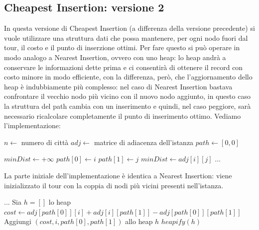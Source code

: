 \documentclass[a4paper,12pt]{report}
\begin{document}
\subsection{Cheapest Insertion: versione 2}
In questa versione di Cheapest Insertion (a differenza della versione precedente) si vuole utilizzare una struttura dati che possa mantenere, per ogni nodo fuori dal tour, il costo e il punto di inserzione ottimi. Per fare questo si può operare in modo analogo a Nearest Insertion, ovvero con uno heap: lo heap andrà a conservare le informazioni dette prima e ci consentirà di ottenere il record con costo minore in modo efficiente, con la differenza, però, che l'aggiornamento dello heap è indubbiamente più complesso: nel caso di Nearest Insertion bastava confrontare il vecchio nodo più vicino con il nuovo nodo aggiunto, in questo caso la struttura del path cambia con un inserimento e quindi, nel caso peggiore, sarà necessario ricalcolare completamente il punto di inserimento ottimo. Vediamo l'implementazione:
\begin{tcolorbox}[colframe=black, colback=white, boxrule=0.5pt, title=Cheapest Insertion Versione 2, coltitle=black, fonttitle=\bfseries, colbacktitle=white, breakable]
  \begin{algorithmic}[1]
    \State $n \gets$ numero di città
    \State $adj \gets$ matrice di adiacenza dell'istanza
    \State $path \gets [0, 0]$
    
    \State $minDist \gets +\infty$
          \State $path[0] \gets i$
          \State $path[1] \gets j$
          \State $minDist \gets adj[i][j]$
        \EndIf
      \EndFor
    \EndFor
    \State ...
  \end{algorithmic}
\end{tcolorbox}
La parte iniziale dell'implementazione è identica a Nearest Insertion: viene inizializzato il tour con la coppia di nodi più vicini presenti nell'istanza.
\begin{tcolorbox}[colframe=black, colback=white, boxrule=0.5pt, title=Cheapest Insertion Versione 2, coltitle=black, fonttitle=\bfseries, colbacktitle=white, breakable]
  \begin{algorithmic}[1]
    \State ...
    \State Sia $h = []$ lo heap
      \State $cost \gets adj[path[0]][i] + adj[i][path[1]] - adj[path[0]][path[1]]$
      \State Aggiungi $(cost, i, path[0], path[1])$ allo heap $h$
    \EndFor
    \State $heapify(h)$
  \end{algorithmic}
\end{tcolorbox}
\end{document}
